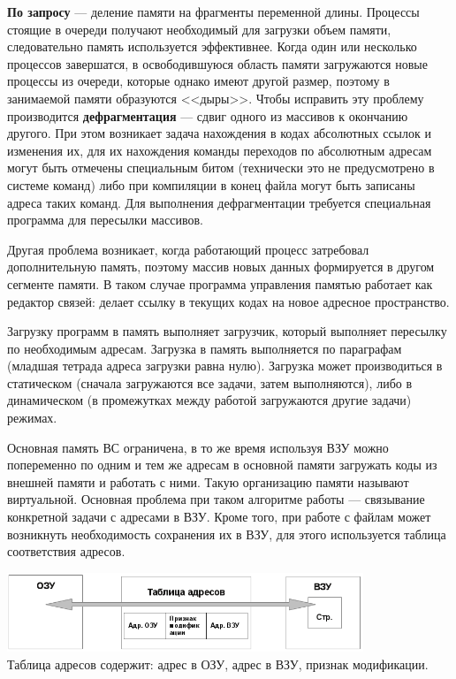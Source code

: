 \documentclass[unicode, 12pt, a4paper, oneside]{article}
\begin{document}
\textbf{По запросу} --- деление памяти на фрагменты переменной длины. Процессы стоящие в очереди получают необходимый для загрузки объем памяти, следовательно память используется эффективнее. Когда один или несколько процессов завершатся, в освободившуюся область памяти загружаются новые процессы из очереди, которые однако имеют другой размер, поэтому в занимаемой памяти образуются <<дыры>>. Чтобы исправить эту проблему производится \textbf{дефрагментация} --- сдвиг одного из массивов к окончанию другого. При этом возникает задача нахождения в кодах абсолютных ссылок и изменения их, для их нахождения команды переходов по абсолютным адресам могут быть отмечены специальным битом (технически это не предусмотрено в системе команд) либо при компиляции в конец файла могут быть записаны адреса таких команд. Для выполнения дефрагментации требуется специальная программа для пересылки массивов.

Другая проблема возникает, когда работающий процесс затребовал дополнительную память, поэтому массив новых данных формируется в другом сегменте памяти. В таком случае программа управления памятью работает как редактор связей: делает ссылку в текущих кодах на новое адресное пространство.

Загрузку программ в память выполняет загрузчик, который выполняет пересылку по необходимым адресам. Загрузка в память выполняется по параграфам (младшая тетрада адреса загрузки равна нулю). Загрузка может производиться в статическом (сначала загружаются все задачи, затем выполняются), либо в динамическом (в промежутках между работой загружаются другие задачи) режимах.

Основная память ВС ограничена, в то же время используя ВЗУ можно попеременно по одним и тем же адресам в основной памяти загружать коды из внешней памяти и работать с ними. Такую организацию памяти называют виртуальной. Основная проблема при таком алгоритме работы — связывание конкретной задачи с адресами в ВЗУ. Кроме того, при работе с файлам может возникнуть необходимость сохранения их в ВЗУ, для этого используется таблица соответствия адресов.

\begin{center} %
\includegraphics[width=0.8\textwidth]{virt_mem.png}\\
Таблица адресов содержит: адрес в ОЗУ, адрес в ВЗУ, признак модификации.
\end{center}
\end{document}
